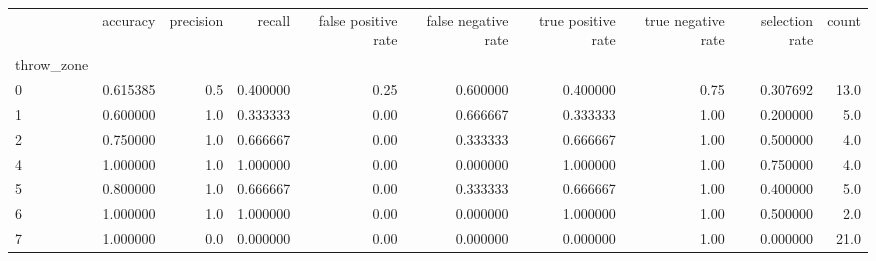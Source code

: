 \begin{tabular}{lrrrrrrrrr}
\toprule
{} &  accuracy &  precision &    recall &  false positive rate &  false negative rate &  true positive rate &  true negative rate &  selection rate &  count \\
throw\_zone &           &            &           &                      &                      &                     &                     &                 &        \\
\midrule
0          &  0.615385 &        0.5 &  0.400000 &                 0.25 &             0.600000 &            0.400000 &                0.75 &        0.307692 &   13.0 \\
1          &  0.600000 &        1.0 &  0.333333 &                 0.00 &             0.666667 &            0.333333 &                1.00 &        0.200000 &    5.0 \\
2          &  0.750000 &        1.0 &  0.666667 &                 0.00 &             0.333333 &            0.666667 &                1.00 &        0.500000 &    4.0 \\
4          &  1.000000 &        1.0 &  1.000000 &                 0.00 &             0.000000 &            1.000000 &                1.00 &        0.750000 &    4.0 \\
5          &  0.800000 &        1.0 &  0.666667 &                 0.00 &             0.333333 &            0.666667 &                1.00 &        0.400000 &    5.0 \\
6          &  1.000000 &        1.0 &  1.000000 &                 0.00 &             0.000000 &            1.000000 &                1.00 &        0.500000 &    2.0 \\
7          &  1.000000 &        0.0 &  0.000000 &                 0.00 &             0.000000 &            0.000000 &                1.00 &        0.000000 &   21.0 \\
\bottomrule
\end{tabular}
